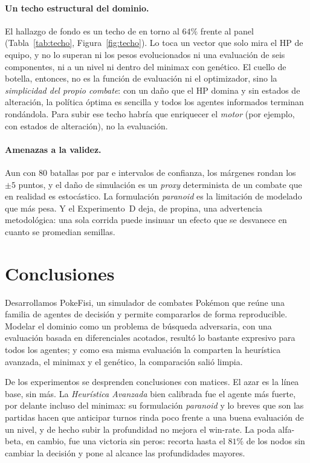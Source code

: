 \documentclass[11pt]{article}
\begin{document}
\paragraph{Un techo estructural del dominio.} El hallazgo de fondo es un techo de
en torno al $64\%$ frente al panel (Tabla~\ref{tab:techo}, Figura~\ref{fig:techo}).
Lo toca un vector que solo mira el HP de equipo, y no lo superan ni los pesos
evolucionados ni una evaluación de seis componentes, ni a un nivel ni dentro del
minimax con genético. El cuello de botella, entonces, no es la función de
evaluación ni el optimizador, sino la \emph{simplicidad del propio combate}: con un
daño que el HP domina y sin estados de alteración, la política óptima es sencilla y
todos los agentes informados terminan rondándola. Para subir ese techo habría que
enriquecer el \emph{motor} (por ejemplo, con estados de alteración), no la
evaluación.

\paragraph{Amenazas a la validez.} Aun con $80$ batallas por par e intervalos de
confianza, los márgenes rondan los $\pm 5$ puntos, y el daño de simulación es un
\emph{proxy} determinista de un combate que en realidad es estocástico. La
formulación \emph{paranoid} es la limitación de modelado que más pesa. Y el
Experimento~D deja, de propina, una advertencia metodológica: una sola corrida puede
insinuar un efecto que se desvanece en cuanto se promedian semillas.

\section{Conclusiones}

Desarrollamos PokeFisi, un simulador de combates Pokémon que reúne una familia de
agentes de decisión y permite compararlos de forma reproducible. Modelar el dominio
como un problema de búsqueda adversaria, con una evaluación basada en diferenciales
acotados, resultó lo bastante expresivo para todos los agentes; y como esa misma
evaluación la comparten la heurística avanzada, el minimax y el genético, la
comparación salió limpia.

De los experimentos se desprenden conclusiones con matices. El azar es la línea
base, sin más. La \emph{Heurística Avanzada} bien calibrada fue el agente más
fuerte, por delante incluso del minimax: su formulación \emph{paranoid} y lo breves
que son las partidas hacen que anticipar turnos rinda poco frente a una buena
evaluación de un nivel, y de hecho subir la profundidad no mejora el win-rate. La
poda alfa-beta, en cambio, fue una victoria sin peros: recorta hasta el $81\%$ de
los nodos sin cambiar la decisión y pone al alcance las profundidades mayores.
\end{document}
